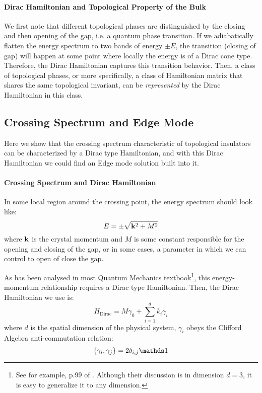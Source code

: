 \documentclass{article}
\begin{document}
\paragraph{Dirac Hamiltonian and Topological Property of the Bulk}
We first note that different topological phases are distinguished by the closing
and then opening of the gap, i.e. a quantum phase transition. If we adiabatically
flatten the energy spectrum to two bands of energy $\pm E$, the transition
(closing of gap) will happen at some point where locally the energy is of a
Dirac cone type. Therefore, the Dirac Hamiltonian captures this transition
behavior. Then, a class of topological phases, or more specifically, a class of
Hamiltonian matrix that shares the same topological invariant, can be
\textit{represented} by the Dirac Hamiltonian in this class.

\subsection{Crossing Spectrum and Edge Mode}
\label{sec:Crossing Spectrum and Edge Mode}
Here we show that the crossing spectrum characteristic of topological insulators
can be characterized by a Dirac type Hamiltonian, and with this Dirac
Hamiltonian we could find an Edge mode solution built into it.

\paragraph{Crossing Spectrum and Dirac Hamiltonian}
In some local region around the crossing point, the energy spectrum should look
like:
\begin{equation}
    E = \pm \sqrt{\vb{k}^2 + M^2}
\end{equation}
where $\vb{k}$ is the crystal momentum and $M$ is some constant
responsible for the opening and closing of the gap, or in some cases, a parameter
in which we can control to open of close the gap.

As has been analysed in most Quantum Mechanics textbook\footnote{See for
    example, p.99 of \cite{Greiner1997}. Although their discussion is in
dimension $d=3$, it is easy to generalize it to any dimension.}, this energy-momentum
relationship requires a Dirac type Hamiltonian. Then, the Dirac Hamiltonian we
use is:
\begin{equation}
    \label{eq:dirac-H}
    H_\text{Dirac} = M\gamma_0 + \sum_{i=1}^d k_i\gamma_i
\end{equation}
where $d$ is the spatial dimension of the physical system, $\gamma_i$ obeys the
Clifford Algebra anti-commutation relation:
\begin{equation}
    \{\gamma_i,\gamma_j\} = 2\delta_{i,j}\id
\end{equation}
\end{document}

